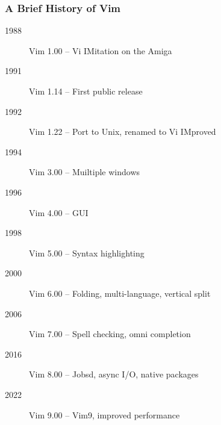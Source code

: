 \begin{frame}[fragile]
  \frametitle{A Brief History of Vim}
  \begin{description}
    \item[1988] Vim 1.00 -- Vi IMitation on the Amiga
    \item[1991] Vim 1.14 -- First public release
    \item[1992] Vim 1.22 -- Port to Unix, renamed to Vi IMproved
    \item[1994] Vim 3.00 -- Muiltiple windows
    \item[1996] Vim 4.00 -- GUI
    \item[1998] Vim 5.00 -- Syntax highlighting
    \item[2000] Vim 6.00 -- Folding, multi-language, vertical split
    \item[2006] Vim 7.00 -- Spell checking, omni completion
    \item[2016] Vim 8.00 -- Jobsd, async I/O, native packages
    \item[2022] Vim 9.00 -- Vim9, improved performance
  \end{description}
\end{frame}
